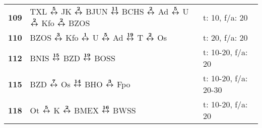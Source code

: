 \begin{minipage}[t]{0.45\textwidth}
\begin{tabular}{>{\bfseries}L{1.2cm}L{9.0cm}L{3.0cm}}
\bus{} 109    & TXL $\xarwe{5}$ JK $\xarwe{2}$ BJUN $\xarwe{11}$ BCHS $\xarwe{2}$ Ad $\xarwe{5}$ U $\xarwe{2}$ Kfo $\xarwe{2}$ BZOS                                                 & t: 10, f/a: 20             \\
\bus{} 110    & BZOS $\xarwe{3}$ Kfo $\xarwe{1}$ U $\xarwe{5}$ Ad $\xarwe{19}$ T $\xarwe{2}$ Os                                                                                     & t: 20, f/a: 20             \\
\bus{} 112    & BNIS $\xarwe{15}$ BZD $\xarwe{19}$ BOSS                                                                                                                             & t: 10-20, f/a: 20          \\
\bus{} 115    & BZD $\xarwe{7}$ Os $\xarwe{14}$ BHO $\xarwe{3}$ Fpo                                                                                                                 & t: 10-20, f/a: 20-30       \\
\bus{} 118    & Ot $\xarwe{5}$ K $\xarwe{2}$ BMEX $\xarwe{16}$ BWSS                                                                                                                 & t: 10-20, f/a: 20          \\
\hline
\end{tabular}
\end{minipage}
\begin{minipage}[t]{0.05\textwidth}
\phantom{Tor}
\end{minipage}

